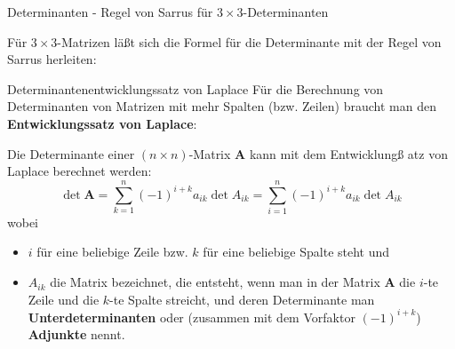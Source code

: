 \begin{frame}{Determinanten - Regel von Sarrus für $3 \times 3$-Determinanten}
	\begin{bemerkung}
	Für $3 \times 3$-Matrizen läßt sich die Formel für die Determinante mit der Regel von Sarrus herleiten:
\begin{center}
\end{center}
\end{bemerkung}
\end{frame}

\begin{frame}{Determinantenentwicklungssatz von Laplace}
	Für die Berechnung von Determinanten von Matrizen mit mehr Spalten (bzw. Zeilen) braucht man den \textbf{Entwicklungssatz von Laplace}:
	\begin{theorem}
		Die Determinante einer $(n \times n)$-Matrix $\pmb{A}$ kann mit dem Entwicklungß atz von Laplace berechnet werden:
		\[
		\det \pmb{A} = \sum\limits_{k=1}^{n} (-1)^{i+k} a_{ik} \det A_{ik} = \sum\limits_{i=1}^{n} (-1)^{i+k} a_{ik} \det A_{ik}
		\]
		wobei
		\begin{itemize}
		\item $i$ für eine beliebige Zeile bzw. $k$ für eine beliebige Spalte steht und
		\item $A_{ik}$ die Matrix bezeichnet, die entsteht, wenn man in der Matrix $\pmb{A}$ die $i$-te Zeile und die $k$-te Spalte streicht, und deren Determinante man \textbf{Unterdeterminanten} oder (zusammen mit dem Vorfaktor $(-1)^{i+k}$) \textbf{Adjunkte} nennt.
		\end{itemize}
	\end{theorem}
\end{frame}

